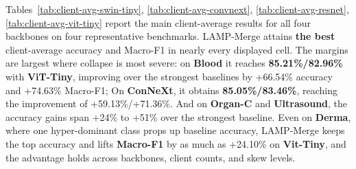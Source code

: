 \documentclass[letterpaper]{article} %
\begin{document}
Tables~\ref{tab:client-avg-swin-tiny}, \ref{tab:client-avg-convnext}, \ref{tab:client-avg-resnet}, \ref{tab:client-avg-vit-tiny} report the main client-average results for all four backbones on four representative benchmarks. LAMP-Merge attains \textbf{the best} client-average accuracy and Macro-F1 in nearly every displayed cell. The margins are largest where collapse is most severe: on \textbf{Blood} it reaches \textbf{85.21\%/82.96\%} with \textbf{ViT-Tiny},  improving over the strongest baselines by \textcolor{DropRed}{+66.54\%} accuracy and \textcolor{DropRed}{+74.63\%} Macro-F1; On \textbf{ConNeXt}, it obtains \textbf{85.05\%/83.46\%}, reaching the improvement of \textcolor{DropRed}{+59.13\%/+71.36\%}. And on \textbf{Organ-C} and \textbf{Ultrasound}, the accuracy gains span \textcolor{DropRed}{+24\%} to \textcolor{DropRed}{+51\%} over the strongest baseline. Even on \textbf{Derma}, where one hyper-dominant class props up baseline accuracy, LAMP-Merge keeps the top accuracy and lifts \textbf{Macro-F1} by as much as \textcolor{DropRed}{+24.10\%} on \textbf{Vit-Tiny}, and the advantage holds across backbones, client counts, and skew levels.


\setcounter{dbltopnumber}{4}
\setcounter{topnumber}{4}
\setcounter{totalnumber}{4}

\iffalse
\end{document}

